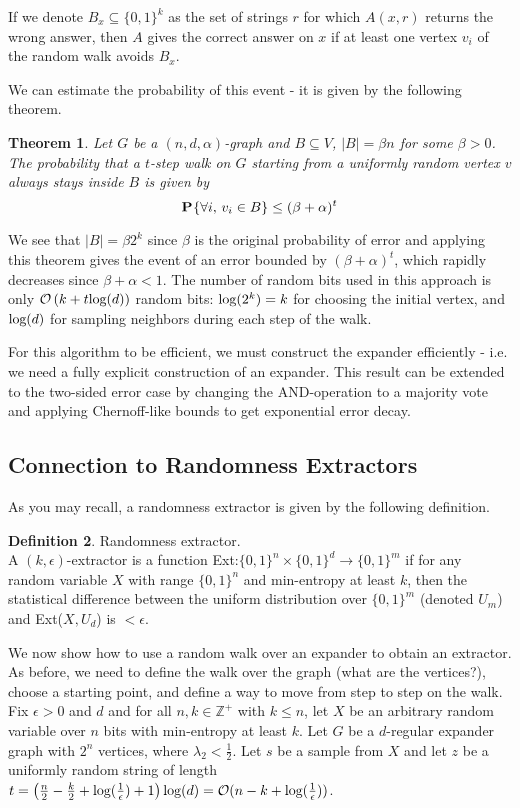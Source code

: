 \documentclass[11pt]{article}
\newtheorem{theorem}{Theorem}[section]
\theoremstyle{definition}
\newtheorem{definition}[theorem]{Definition}
\theoremstyle{definition}
\theoremstyle{definition}
\newcommand{\mc}[1]
{\mathcal{#1}}
\newcommand{\txt}[1]
{\textnormal{#1}}
\newcommand{\prob}[2]
{\textbf{P}_{#1}\{{#2}\}}
\begin{document}
If we denote $B_x \subseteq \{0, 1\}^k$ as the set of strings $r$ for which $A(x, r)$ returns the wrong answer, then $A$ gives the correct answer on $x$ if at least one vertex $v_i$ of the random walk avoids $B_x$. 

We can estimate the probability of this event - it is given by the following theorem. 

\begin{theorem} Let $G$ be a $(n, d, \alpha)$-graph and $B \subseteq V$, $|B| = \beta n$ for some $\beta > 0$. The probability that a $t$-step walk on $G$ starting from a uniformly random vertex $v$ always stays inside $B$ is given by 
\[
\prob{}{\forall i \txt{, } v_i \in B} \leq (\beta + \alpha)^t
\]
\end{theorem}

We see that $|B| = \beta 2^k$ since $\beta$ is the original probability of error and applying this theorem gives the event of an error bounded by $(\beta + \alpha)^t$, which rapidly decreases since $\beta + \alpha < 1$. The number of random bits used in this approach is only $\mc{O}\left(k + t \txt{log}(d)\right)$ random bits: $\txt{log}(2^k) = k$ for choosing the initial vertex, and $\txt{log}(d)$ for sampling neighbors during each step of the walk. 

For this algorithm to be efficient, we must construct the expander efficiently - i.e. we need a fully explicit construction of an expander. This result can be extended to the two-sided error case by changing the AND-operation to a majority vote and applying Chernoff-like bounds to get exponential error decay.


\subsection{Connection to Randomness Extractors}

As you may recall, a randomness extractor is given by the following definition. 

\begin{definition} Randomness extractor. \\
A $(k, \epsilon)$-extractor is a function Ext:$\{0, 1\}^n \times \{0, 1\}^d \to \{0, 1\}^m$
if for any random variable $X$ with range $\{0, 1\}^n$ and min-entropy at least $k$, then the statistical difference between the uniform distribution over $\{0, 1\}^m$ (denoted $U_m$) and Ext($X, U_d$) is $< \epsilon$. 
\end{definition}

We now show how to use a random walk over an expander to obtain an extractor. 
As before, we need to define the walk over the graph (what are the vertices?), choose a starting point, and define a way to move from step to step on the walk. 
Fix $\epsilon > 0$ and $d$ and for all $n, k \in \mathbb{Z}^+$ with $k \leq n$, let $X$ be an arbitrary
random variable over $n$ bits with min-entropy at least $k$. Let $G$ be a $d$-regular expander graph with $2^n$ vertices, where $\lambda_2 < \frac{1}{2}$. Let $s$ be a sample from $X$ and let $z$ be a uniformly random string of length $t = \left(\frac{n}{2} - \frac{k}{2} + \txt{log}(\frac{1}{\epsilon}) + 1\right)\txt{log}(d) = \mc{O}(n - k + \txt{log}(\frac{1}{\epsilon}))$. 
\end{document}
